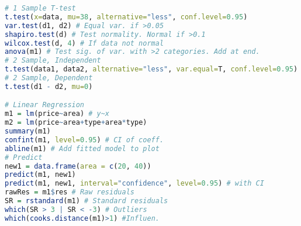 \documentclass{article}
\begin{document}
\begin{multicols*}{4}
\begin{lstlisting}[language=R, breaklines=true]
# 1 Sample T-test
t.test(x=data, mu=38, alternative="less", conf.level=0.95)
var.test(d1, d2) # Equal var. if >0.05
shapiro.test(d) # Test normality. Normal if >0.1
wilcox.test(d, 4) # If data not normal
anova(m1) # Test sig. of var. with >2 categories. Add at end.
# 2 Sample, Independent
t.test(data1, data2, alternative="less", var.equal=T, conf.level=0.95)
# 2 Sample, Dependent
t.test(d1 - d2, mu=0)

# Linear Regression
m1 = lm(price~area) # y~x
m2 = lm(price~area+type+area*type) 
summary(m1)
confint(m1, level=0.95) # CI of coeff.
abline(m1) # Add fitted model to plot
# Predict
new1 = data.frame(area = c(20, 40))
predict(m1, new1)
predict(m1, new1, interval="confidence", level=0.95) # with CI
rawRes = m1$res # Raw residuals
SR = rstandard(m1) # Standard residuals
which(SR > 3 | SR < -3) # Outliers
which(cooks.distance(m1)>1) #Influen.
\end{lstlisting}

\end{multicols*}
\end{document}
